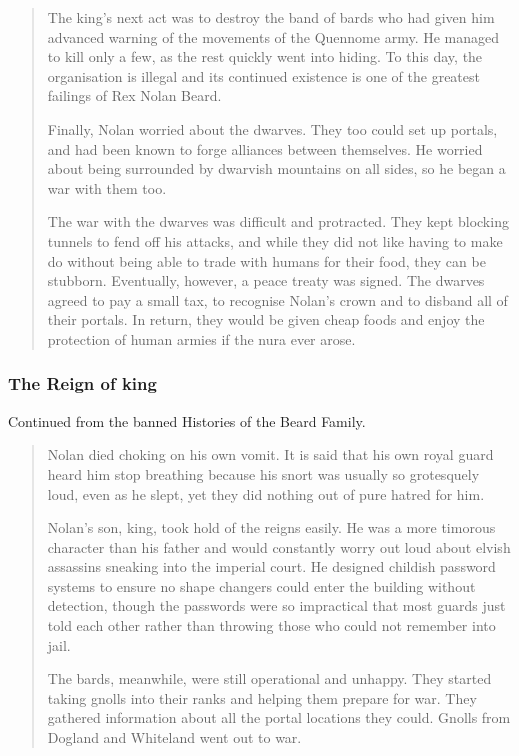\begin{multicols}{2}
\begin{quotation}
	The king's next act was to destroy the band of bards who had given him advanced warning of the movements of the Quennome army.
	He managed to kill only a few, as the rest quickly went into hiding.
	To this day, the organisation is illegal and its continued existence is one of the greatest failings of Rex Nolan Beard.

	Finally, Nolan worried about the dwarves.
	They too could set up portals, and had been known to forge alliances between themselves.
	He worried about being surrounded by dwarvish mountains on all sides, so he began a war with them too.

	The war with the dwarves was difficult and protracted.
	They kept blocking tunnels to fend off his attacks, and while they did not like having to make do without being able to trade with humans for their food, they can be stubborn.
	Eventually, however, a peace treaty was signed.
	The dwarves agreed to pay a small tax, to recognise Nolan's crown and to disband all of their portals.
	In return, they would be given cheap foods and enjoy the protection of human armies if the nura ever arose.

\end{quotation}

\subsubsection{The Reign of \gls{king}}

Continued from the banned Histories of the Beard Family.

\begin{quotation}

	Nolan died choking on his own vomit.
	It is said that his own royal guard heard him stop breathing because his snort was usually so grotesquely loud, even as he slept, yet they did nothing out of pure hatred for him.

	Nolan's son, \gls{king}, took hold of the reigns easily.
	He was a more timorous character than his father and would constantly worry out loud about elvish assassins sneaking into the imperial court.
	He designed childish password systems to ensure no shape changers could enter the building without detection, though the passwords were so impractical that most guards just told each other rather than throwing those who could not remember into jail.

	The bards, meanwhile, were still operational and unhappy.
	They started taking gnolls into their ranks and helping them prepare for war.
	They gathered information about all the portal locations they could.
	Gnolls from Dogland and Whiteland went out to war.


\end{quotation}
\end{multicols}
